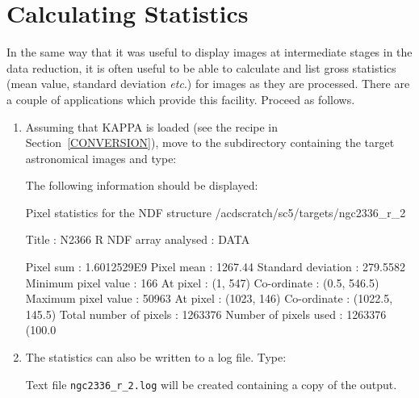 \documentclass[twoside,11pt]{starlink}
\begin{document}
\newpage
\section{\label{STATISTICS}Calculating Statistics}

In the same way that it was useful to display images at intermediate
stages in the data reduction, it is often useful to be able to calculate
and list gross statistics (mean value, standard deviation  \emph{etc}.)
for images as they are processed.  There are a couple of applications
which provide this facility.  Proceed as follows.

\begin{enumerate}

  \item Assuming that KAPPA is loaded (see the recipe in
   Section~\ref{CONVERSION}),    move to the subdirectory containing the
   target astronomical images and type:

\begin{terminalv}
\end{terminalv}

   The following information should be displayed:

\begin{small}
\begin{terminalv}
Pixel statistics for the NDF structure /acdscratch/sc5/targets/ngc2336_r_2

   Title                     : N2366 R
   NDF array analysed        : DATA

      Pixel sum              : 1.6012529E9
      Pixel mean             : 1267.44
      Standard deviation     : 279.5582
      Minimum pixel value    : 166
         At pixel            : (1, 547)
         Co-ordinate         : (0.5, 546.5)
      Maximum pixel value    : 50963
         At pixel            : (1023, 146)
         Co-ordinate         : (1022.5, 145.5)
      Total number of pixels : 1263376
      Number of pixels used  : 1263376 (100.0%
\end{terminalv}
\end{small}

  \item The statistics can also be written to a log file.  Type:

\begin{terminalv}
\end{terminalv}

   Text file \texttt{ngc2336\_r\_2.log} will be created containing a copy
   of the output.


\end{enumerate}
\end{document}
